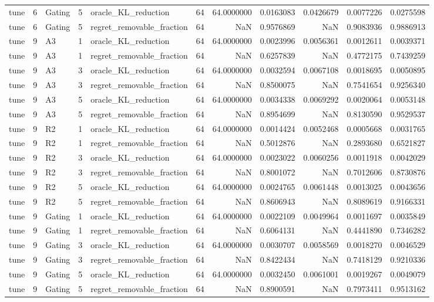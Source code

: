 \begin{tabular}{lrlrlrrrrrr}
tune & 6 & Gating & 5 & oracle_KL_reduction & 64 & 64.0000000 & 0.0163083 & 0.0426679 & 0.0077226 & 0.0275598 \\
tune & 6 & Gating & 5 & regret_removable_fraction & 64 & NaN & 0.9576869 & NaN & 0.9083936 & 0.9886913 \\
tune & 9 & A3 & 1 & oracle_KL_reduction & 64 & 64.0000000 & 0.0023996 & 0.0056361 & 0.0012611 & 0.0039371 \\
tune & 9 & A3 & 1 & regret_removable_fraction & 64 & NaN & 0.6257839 & NaN & 0.4772175 & 0.7439259 \\
tune & 9 & A3 & 3 & oracle_KL_reduction & 64 & 64.0000000 & 0.0032594 & 0.0067108 & 0.0018695 & 0.0050895 \\
tune & 9 & A3 & 3 & regret_removable_fraction & 64 & NaN & 0.8500075 & NaN & 0.7541654 & 0.9256340 \\
tune & 9 & A3 & 5 & oracle_KL_reduction & 64 & 64.0000000 & 0.0034338 & 0.0069292 & 0.0020064 & 0.0053148 \\
tune & 9 & A3 & 5 & regret_removable_fraction & 64 & NaN & 0.8954699 & NaN & 0.8130590 & 0.9529537 \\
tune & 9 & R2 & 1 & oracle_KL_reduction & 64 & 64.0000000 & 0.0014424 & 0.0052468 & 0.0005668 & 0.0031765 \\
tune & 9 & R2 & 1 & regret_removable_fraction & 64 & NaN & 0.5012876 & NaN & 0.2893680 & 0.6521827 \\
tune & 9 & R2 & 3 & oracle_KL_reduction & 64 & 64.0000000 & 0.0023022 & 0.0060256 & 0.0011918 & 0.0042029 \\
tune & 9 & R2 & 3 & regret_removable_fraction & 64 & NaN & 0.8001072 & NaN & 0.7012606 & 0.8730876 \\
tune & 9 & R2 & 5 & oracle_KL_reduction & 64 & 64.0000000 & 0.0024765 & 0.0061448 & 0.0013025 & 0.0043656 \\
tune & 9 & R2 & 5 & regret_removable_fraction & 64 & NaN & 0.8606943 & NaN & 0.8089619 & 0.9166331 \\
tune & 9 & Gating & 1 & oracle_KL_reduction & 64 & 64.0000000 & 0.0022109 & 0.0049964 & 0.0011697 & 0.0035849 \\
tune & 9 & Gating & 1 & regret_removable_fraction & 64 & NaN & 0.6064131 & NaN & 0.4441890 & 0.7346282 \\
tune & 9 & Gating & 3 & oracle_KL_reduction & 64 & 64.0000000 & 0.0030707 & 0.0058569 & 0.0018270 & 0.0046529 \\
tune & 9 & Gating & 3 & regret_removable_fraction & 64 & NaN & 0.8422434 & NaN & 0.7418129 & 0.9210336 \\
tune & 9 & Gating & 5 & oracle_KL_reduction & 64 & 64.0000000 & 0.0032450 & 0.0061001 & 0.0019267 & 0.0049079 \\
tune & 9 & Gating & 5 & regret_removable_fraction & 64 & NaN & 0.8900591 & NaN & 0.7973411 & 0.9513162 \\
\bottomrule
\end{tabular}

